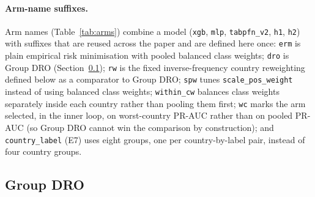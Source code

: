\documentclass[11pt]{article}
\newcommand{\arm}[1]{\texttt{#1}}
\begin{document}
\paragraph{Arm-name suffixes.} Arm names (Table~\ref{tab:arms}) combine a model (\arm{xgb}, \arm{mlp}, \arm{tabpfn\_v2}, \arm{h1}, \arm{h2}) with suffixes that are reused across the paper and are defined here once: \arm{erm} is plain empirical risk minimisation with pooled balanced class weights; \arm{dro} is Group DRO (Section~\ref{sec:dro}); \arm{rw} is the fixed inverse-frequency country reweighting defined below as a comparator to Group DRO; \arm{spw} tunes \texttt{scale\_pos\_weight} instead of using balanced class weights; \arm{within\_cw} balances class weights separately inside each country rather than pooling them first; \arm{wc} marks the arm selected, in the inner loop, on worst-country PR-AUC rather than on pooled PR-AUC (so Group DRO cannot win the comparison by construction); and \arm{country\_label} (E7) uses eight groups, one per country-by-label pair, instead of four country groups.

\subsection{Group DRO}
\label{sec:dro}
\end{document}
